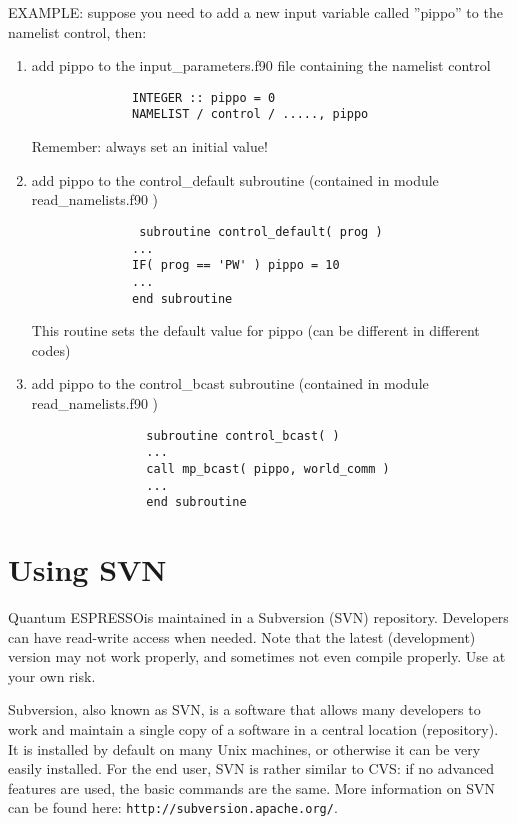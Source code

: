 \documentclass[12pt,a4paper]{article}
\def\qe{{\sc Quantum ESPRESSO}}
\begin{document}
EXAMPLE:
suppose you need to add a new input variable called ''pippo''
to the namelist control, then:

\begin{enumerate}
\item add pippo to the input\_parameters.f90 file containing the
namelist control 
\begin{verbatim}
              INTEGER :: pippo = 0
              NAMELIST / control / ....., pippo
\end{verbatim}
Remember: always set an initial value!

\item add pippo to the control\_default subroutine (contained in
module read\_namelists.f90 ) 
\begin{verbatim}
               subroutine control_default( prog )
              ...
              IF( prog == 'PW' ) pippo = 10
              ...
              end subroutine
\end{verbatim}
This routine sets the default value for pippo (can be different in
different codes) 

\item add pippo to the control\_bcast subroutine (contained in module
read\_namelists.f90 ) 
 \begin{verbatim}
                subroutine control_bcast( )
                ...
                call mp_bcast( pippo, world_comm )
                ...
                end subroutine
\end{verbatim}
\end{enumerate}
 
\section{Using SVN}
\label{Sec:SVN}
\qe is maintained in a Subversion (SVN) repository. Developers can have 
read-write access when needed. Note that the latest (development) version
may not work properly, and sometimes not even compile properly. 
Use at your own risk. 

Subversion, also known as SVN, is a software that allows many
developers to work and maintain a single copy of a software in a
central location (repository).
It is installed by default on many Unix machines, or otherwise 
it can be very easily installed.
For the end user, SVN is rather similar to CVS:
if no advanced features are used, the basic commands are the same.
More information on SVN can be found here: 
\texttt{http://subversion.apache.org/}.
\end{document}
